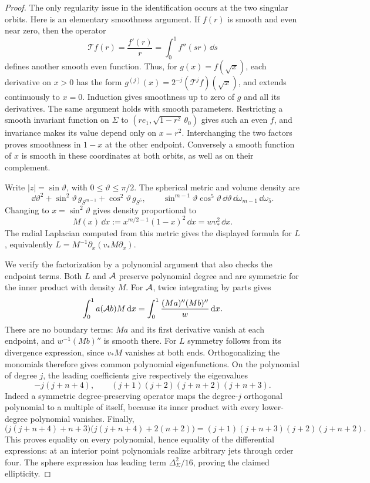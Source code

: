 \begin{proof}
The only regularity issue in the identification occurs at the two
singular orbits.  Here is an elementary smoothness argument.  If
\(f(r)\) is smooth and even near zero, then the operator
\[
 \mathcal T f(r)=\frac{f'(r)}r
              =\int_0^1f''(sr)\,\dd s
\]
defines another smooth even function.  Thus, for \(g(x)=f(\sqrt x)\),
each derivative on \(x>0\) has the form
\(g^{(j)}(x)=2^{-j}(\mathcal T^jf)(\sqrt x)\), and extends
continuously to \(x=0\).  Induction gives smoothness up to zero of
\(g\) and all its derivatives.  The same argument holds with smooth
parameters.  Restricting a smooth invariant function on \(\Sigma\) to
\((re_1,\sqrt{1-r^2}\,\theta_0)\) gives such an even \(f\), and
invariance makes its value depend only on \(x=r^2\).  Interchanging the
two factors proves smoothness in \(1-x\) at the other endpoint.
Conversely a smooth function of \(x\) is smooth in these coordinates
at both orbits, as well as on their complement.

Write \(|z|=\sin\vartheta\), with \(0\leq\vartheta\leq\pi/2\).
The spherical metric and volume density are
\[
 \dd\vartheta^2+\sin^2\vartheta\,g_{S^{m-1}}
                 +\cos^2\vartheta\,g_{S^5},\qquad
 \sin^{m-1}\vartheta\cos^5\vartheta\,\dd\vartheta\,
       \dd\omega_{m-1}\,\dd\omega_5.
\]
Changing to \(x=\sin^2\vartheta\) gives density proportional to
\[
 M(x)\,\dd x:=x^{m/2-1}(1-x)^2\,\dd x
              =wv_*^2\,\dd x.
\]
The radial Laplacian computed from this metric gives the displayed
formula for \(L\), equivalently
\(L=M^{-1}\partial_x(v_*M\partial_x)\).

We verify the factorization by a polynomial argument that also checks
the endpoint terms.  Both \(L\) and \(\mathcal A\) preserve polynomial degree
and are symmetric for the inner product with density \(M\).  For
\(\mathcal A\), twice integrating by parts gives
\begin{equation}\label{geo:symmetry}
 \int_0^1 a(\mathcal A b)M\,\mathrm{d} x
 =\int_0^1\frac{(Ma)''(Mb)''}{w}\,\mathrm{d} x.
\end{equation}
There are no boundary terms: \(Ma\) and its first derivative vanish
at each endpoint, and \(w^{-1}(Mb)''\) is smooth there.  For \(L\)
symmetry follows from its divergence expression, since \(v_*M\)
vanishes at both ends.  Orthogonalizing the monomials therefore gives
common polynomial eigenfunctions.  On the polynomial of degree \(j\),
the leading coefficients give respectively the eigenvalues
\[
 -j(j+n+4),\qquad
 (j+1)(j+2)(j+n+2)(j+n+3).
\]
Indeed a symmetric degree-preserving operator maps the degree-\(j\)
orthogonal polynomial to a multiple of itself, because its inner
product with every lower-degree polynomial vanishes.  Finally,
\[
 \big(j(j+n+4)+n+3\big)
 \big(j(j+n+4)+2(n+2)\big)
 =(j+1)(j+n+3)(j+2)(j+n+2).
\]
This proves equality on every polynomial, hence equality of the
differential expressions: at an interior point polynomials realize
arbitrary jets through order four.  The sphere expression has leading
term \(\Delta_\Sigma^2/16\), proving the claimed ellipticity.


\end{proof}

